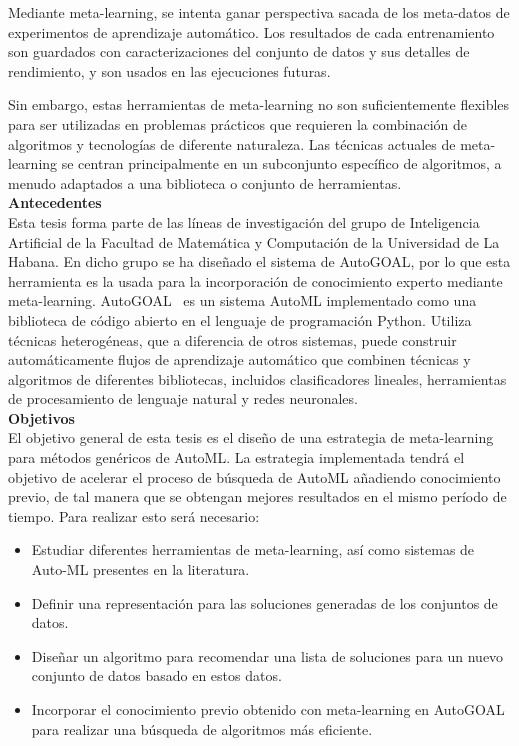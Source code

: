 Mediante meta-learning, se intenta ganar perspectiva sacada de los meta-datos
de experimentos de aprendizaje automático. Los resultados de cada entrenamiento
son guardados con caracterizaciones del conjunto de datos y sus detalles de
rendimiento, y son usados en las ejecuciones futuras.

Sin embargo, estas herramientas de meta-learning no son suficientemente
flexibles para ser utilizadas en problemas prácticos que requieren la
combinación de algoritmos y tecnologías de diferente naturaleza. Las técnicas
actuales de meta-learning se centran principalmente en un subconjunto
específico de algoritmos, a menudo adaptados a una biblioteca o conjunto de
herramientas.\\

\textbf{\Large Antecedentes}\\

Esta tesis forma parte de las líneas de investigación del grupo de Inteligencia
Artificial de la Facultad de Matemática y Computación de la Universidad de La
Habana. En dicho grupo se ha diseñado el sistema de AutoGOAL, por lo que esta
herramienta es la usada para la incorporación de conocimiento experto mediante
meta-learning. AutoGOAL~ es un sistema AutoML implementado
como una biblioteca de código abierto en el lenguaje de programación Python.
Utiliza técnicas heterogéneas, que a diferencia de otros sistemas, puede
construir automáticamente flujos de aprendizaje automático que combinen
técnicas y algoritmos de diferentes bibliotecas, incluidos clasificadores
lineales, herramientas de procesamiento de lenguaje natural y redes neuronales.\\

\textbf{\Large Objetivos}\\

El objetivo general de esta tesis es el diseño de una estrategia de
meta-learning para métodos genéricos de AutoML. La estrategia implementada
tendrá el objetivo de acelerar el proceso de búsqueda de AutoML añadiendo
conocimiento previo, de tal manera que se obtengan mejores resultados en el
mismo período de tiempo. Para realizar esto será necesario:

\begin{itemize}
    \item Estudiar diferentes herramientas de meta-learning, así como sistemas
    de Auto-ML presentes en la literatura.
    \item Definir una representación para las soluciones generadas de los
    conjuntos de datos.
    \item Diseñar un algoritmo para recomendar una lista de soluciones para un
    nuevo conjunto de datos basado en estos datos.
    \item Incorporar el conocimiento previo obtenido con meta-learning en
    AutoGOAL para realizar una búsqueda de algoritmos más eficiente.
    
\end{itemize}

